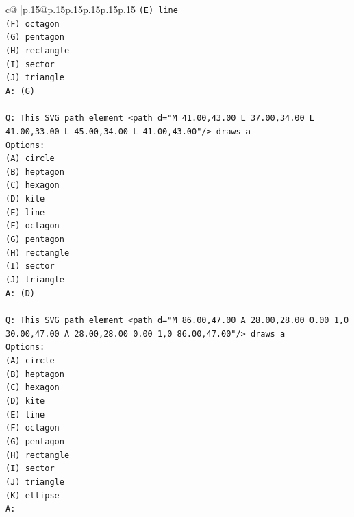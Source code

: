 \documentclass{article}
\begin{document}
{\begin{supertabular}{c@{$\;$}|p{.15\linewidth}@{}p{.15\linewidth}p{.15\linewidth}p{.15\linewidth}p{.15\linewidth}p{.15\linewidth}}
{{{\texttt{(E) line} \\
\texttt{(F) octagon} \\
\texttt{(G) pentagon} \\
\texttt{(H) rectangle} \\
\texttt{(I) sector} \\
\texttt{(J) triangle} \\
\texttt{A: (G)} \\
\\ 
\texttt{Q: This SVG path element <path d="M 41.00,43.00 L 37.00,34.00 L 41.00,33.00 L 45.00,34.00 L 41.00,43.00"/> draws a} \\
\texttt{Options:} \\
\texttt{(A) circle} \\
\texttt{(B) heptagon} \\
\texttt{(C) hexagon} \\
\texttt{(D) kite} \\
\texttt{(E) line} \\
\texttt{(F) octagon} \\
\texttt{(G) pentagon} \\
\texttt{(H) rectangle} \\
\texttt{(I) sector} \\
\texttt{(J) triangle} \\
\texttt{A: (D)} \\
\\ 
\texttt{Q: This SVG path element <path d="M 86.00,47.00 A 28.00,28.00 0.00 1,0 30.00,47.00 A 28.00,28.00 0.00 1,0 86.00,47.00"/> draws a} \\
\texttt{Options:} \\
\texttt{(A) circle} \\
\texttt{(B) heptagon} \\
\texttt{(C) hexagon} \\
\texttt{(D) kite} \\
\texttt{(E) line} \\
\texttt{(F) octagon} \\
\texttt{(G) pentagon} \\
\texttt{(H) rectangle} \\
\texttt{(I) sector} \\
\texttt{(J) triangle} \\
\texttt{(K) ellipse} \\
\texttt{A:} \\
            }
        }
    }
     \\ \\


\end{supertabular}}
\end{document}
